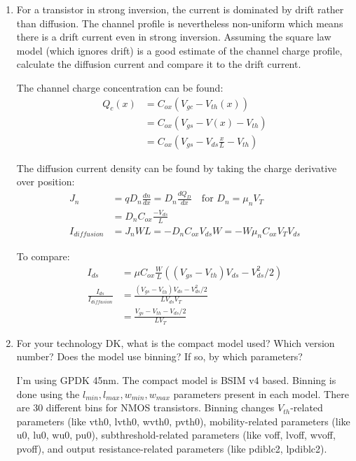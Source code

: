 \begin{enumerate}
\item {\color{blue}For a transistor in strong inversion, the current is dominated by drift rather than diffusion. The channel profile is nevertheless non-uniform which means there is a drift current even in strong inversion. Assuming the square law model (which ignores drift) is a good estimate of the channel charge profile, calculate the diffusion current and compare it to the drift current.}

    The channel charge concentration can be found:
    \begin{align*}
        Q_c(x) &= C_{ox} (V_{gc} - V_{th}(x)) \\
        &= C_{ox} (V_{gs} - V(x) - V_{th}) \\
        &= C_{ox} (V_{gs} - V_{ds} \frac{x}{L} - V_{th})
    \end{align*}

    The diffusion current density can be found by taking the charge derivative over position:
    \begin{align*}
        J_n &= q D_n \frac{dn}{dx} = D_n \frac{d Q_D}{dx} \quad \text{for } D_n = \mu_n V_T \\
        &= D_n C_{ox} \frac{-V_{ds}}{L} \\
        I_{diffusion} &= J_n W L = - D_n C_{ox} V_{ds} W = - W \mu_n C_{ox} V_T V_{ds}
    \end{align*}

    To compare:
    \begin{align*}
        I_{ds} &= \mu C_{ox} \frac{W}{L} ((V_{gs} - V_{th}) V_{ds} - V_{ds}^2/2) \\
        \frac{I_{ds}}{I_{diffusion}} &= \frac{(V_{gs} - V_{th}) V_{ds} - V_{ds}^2 / 2}{L V_{ds} V_T} \\
        &= \frac{V_{gs} - V_{th} - V_{ds}/2}{L V_T}
    \end{align*}

\item {\color{blue}For your technology DK, what is the compact model used? Which version number? Does the model use binning? If so, by which parameters?}

I'm using GPDK 45nm. The compact model is BSIM v4 based. Binning is done using the $l_{min}, l_{max}, w_{min}, w_{max}$ parameters present in each model. There are 30 different bins for NMOS transistors. Binning changes $V_{th}$-related parameters (like vth0, lvth0, wvth0, pvth0), mobility-related parameters (like u0, lu0, wu0, pu0), subthreshold-related parameters (like voff, lvoff, wvoff, pvoff), and output resistance-related parameters (like pdiblc2, lpdiblc2).


\end{enumerate}

